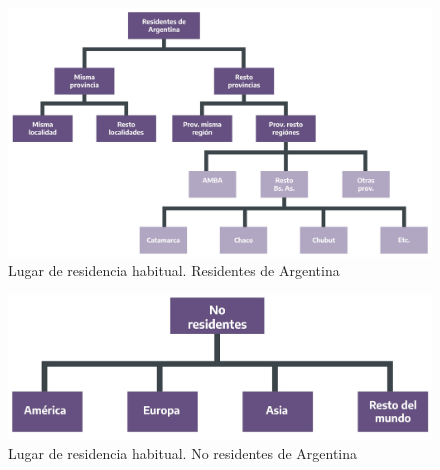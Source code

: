 \documentclass[
]{book}
\begin{document}
\begin{figure}

{\centering \includegraphics[width=1\linewidth]{imagenes/figura_2_1} 

}

\caption{Lugar de residencia habitual. Residentes de Argentina}\label{fig:residentes}
\end{figure}

\hfill\break

\begin{figure}

{\centering \includegraphics[width=1\linewidth]{imagenes/figura_2_2} 

}

\caption{Lugar de residencia habitual. No residentes de Argentina}\label{fig:no-residentes}
\end{figure}
\end{document}

